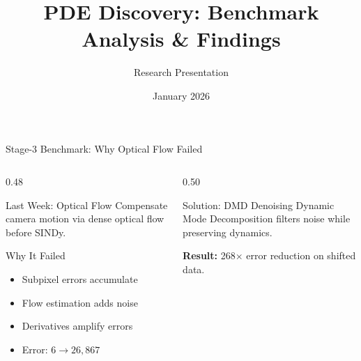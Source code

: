 \documentclass[aspectratio=169]{beamer}
\title[PDE Discovery]{PDE Discovery: Benchmark Analysis \& Findings}
\author{Research Presentation}
\date{January 2026}
\begin{document}
\begin{frame}{Stage-3 Benchmark: Why Optical Flow Failed}

\begin{columns}[T]
    \begin{column}{0.48\textwidth}
        \begin{block}{Last Week: Optical Flow}
            Compensate camera motion via dense optical flow before SINDy.
        \end{block}
        
        \begin{alertblock}{Why It Failed}
            \begin{itemize}
                \item Subpixel errors accumulate
                \item Flow estimation adds noise
                \item Derivatives amplify errors
                \item Error: $6 \rightarrow 26{,}867$
            \end{itemize}
        \end{alertblock}
    \end{column}
    
    \begin{column}{0.50\textwidth}
        \begin{exampleblock}{Solution: DMD Denoising}
            Dynamic Mode Decomposition filters noise while preserving dynamics.
            
            \vspace{0.3cm}
            \textbf{Result:} 268$\times$ error reduction on shifted data.
        \end{exampleblock}
    \end{column}
\end{columns}

\end{frame}
\end{document}
